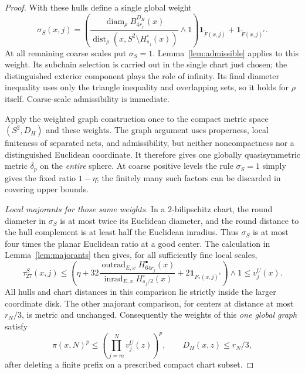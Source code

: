 \documentclass[11pt,reqno]{amsart}
\theoremstyle{plain}
\theoremstyle{definition}
\theoremstyle{remark}
\newcommand{\diam}{\operatorname{diam}}
\newcommand{\inrad}{\operatorname{inrad}}
\newcommand{\outrad}{\operatorname{outrad}}
\newcommand{\dist}{\operatorname{dist}}
\newcommand{\1}{\mathbf{1}}
\begin{document}
\begin{proof}
With these hulls define a single global weight
\begin{equation*}
\sigma_S(x,j)=\left(\frac{\diam_\rho B_{4r_j}^{D_H}(x)}
{\dist_\rho(x,S^2\setminus H_{s_j}^\circ(x))}\wedge1\right)
\1_{\widetilde F(x,j)}+\1_{\widetilde F(x,j)^c}.
\end{equation*}
At all remaining coarse scales put $\sigma_S=1$. Lemma~\ref{lem:admissible} applies to this weight. Its subchain selection is carried out in the single chart just chosen; the distinguished exterior component plays the role of infinity. Its final diameter inequality uses only the triangle inequality and overlapping sets, so it holds for $\rho$ itself. Coarse-scale admissibility is immediate.

Apply the weighted graph construction once to the compact metric space $(S^2,D_H)$ and these weights. The graph argument uses properness, local finiteness of separated nets, and admissibility, but neither noncompactness nor a distinguished Euclidean coordinate. It therefore gives one globally quasisymmetric metric $\delta_p$ on the \emph{entire} sphere. At coarse positive levels the rule $\sigma_S=1$ simply gives the fixed ratio $1-\eta$; the finitely many such factors can be discarded in covering upper bounds.

\emph{Local majorants for those same weights.} In a $2$-bilipschitz chart, the round diameter in $\sigma_S$ is at most twice its Euclidean diameter, and the round distance to the hull complement is at least half the Euclidean inradius. Thus $\sigma_S$ is at most four times the planar Euclidean ratio at a good center. The calculation in Lemma~\ref{lem:majorants} then gives, for all sufficiently fine local scales,
\begin{equation*}
\tau_{27}^{S}(x,j)
\le\left(\eta+32\frac{\outrad_{E,x}H_{64r_j}^\bullet(x)}
{\inrad_{E,x}H_{s_j/2}^\circ(x)}+2\1_{F_*(x,j)^c}\right)\wedge1
\le v_j^U(x).
\end{equation*}
All hulls and chart distances in this comparison lie strictly inside the larger coordinate disk. The other majorant comparison, for centers at distance at most $r_N/3$, is metric and unchanged. Consequently the weights of this \emph{one global graph} satisfy
\begin{equation*}
\pi(x,N)^p\le\left(\prod_{j=m}^Nv_j^U(z)\right)^p,
\qquad D_H(x,z)\le r_N/3,
\end{equation*}
after deleting a finite prefix on a prescribed compact chart subset.


\end{proof}
\end{document}
